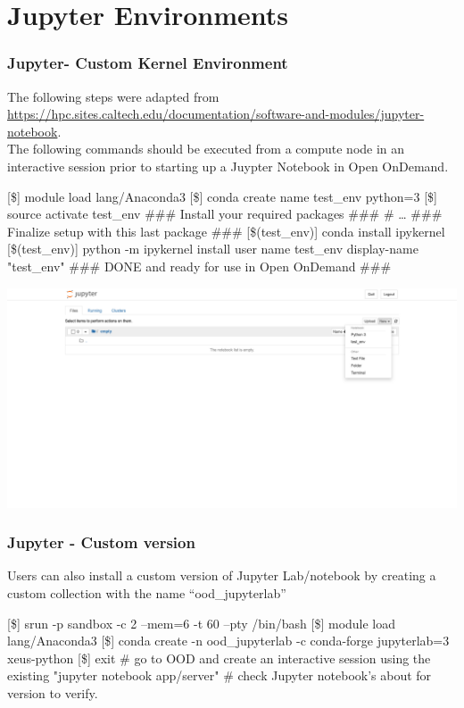\section[Jupyternote]{Jupyter Environments}
\begin{frame}[fragile]
	\frametitle{Jupyter- Custom Kernel Environment}
	\begin{block}{}
	The following steps were adapted from \url{https://hpc.sites.caltech.edu/documentation/software-and-modules/jupyter-notebook}.~\\The following commands should be executed from a compute node in an interactive session prior to starting up a Juypter Notebook in Open OnDemand.
	\end{block}
	\begin{semiverbatim}\footnotesize
	[\$] module load lang/Anaconda3
	[\$] conda create \ddash{}name test\_env python=3
	[\$] source activate test\_env
	\#\#\# Install your required packages \#\#\#
	\# \ldots 
	\#\#\# Finalize setup with this last package \#\#\#
	[\$(test\_env)] conda install ipykernel
	[\$(test\_env)] python -m ipykernel install \ddash{}user \ddash{}name test\_env \ddash{}display-name "test\_env"
	\#\#\# DONE and ready for use in Open OnDemand \#\#\#
 	\end{semiverbatim}
	\vspace{-1.5em}
	\begin{center}
  \includegraphics[scale=0.08]{juypter.png}
	\end{center}	
\end{frame}

\begin{frame}[fragile]
	\frametitle{Jupyter - Custom version}
	\begin{block}{}Users can also install a custom version of Jupyter Lab/notebook by creating a custom collection with the name "`ood\_jupyterlab"'\end{block}
	\begin{semiverbatim}\footnotesize
[\$] srun -p sandbox -c 2 --mem=6 -t 60 --pty /bin/bash
[\$] module load lang/Anaconda3
[\$] conda create -n ood_jupyterlab -c conda-forge jupyterlab=3 xeus-python
[\$] exit 
# go to OOD and create an interactive session using the existing "jupyter
notebook app/server" 
# check Jupyter notebook's about for version to verify.
 	\end{semiverbatim}
	
\end{frame}

